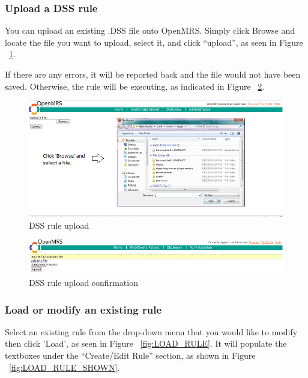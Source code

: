 \documentclass[12pt,letterpaper]{article}
\begin{document}
\newpage
\subsubsection{Upload a DSS rule} \label{sec:UPLOAD_DSS}
	You can upload an existing .DSS file onto OpenMRS. Simply click Browse and locate the file you want to upload, select it, and click “upload”, as seen in Figure ~\ref{fig:UPLOAD_BROWSE}. 
	
	If there are any errors, it will be reported back and the file would not have been saved. Otherwise, the rule will be executing, as indicated in Figure ~\ref{fig:UPLOAD_SUCCESS}.

\begin{figure}[htbp]
\begin{center}
\includegraphics[width=6.5in]{user_guide/upload_browse.png}
\end{center}
\caption{DSS rule upload}
\label{fig:UPLOAD_BROWSE}
\end{figure}

\begin{figure}[htbp]
\begin{center}
\includegraphics[width=6.5in]{user_guide/upload_success.png}
\end{center}
\caption{DSS rule upload confirmation}
\label{fig:UPLOAD_SUCCESS}
\end{figure}


\subsubsection{Load or modify an existing rule} \label{sec:LOAD_RULE}

Select an existing rule from the drop-down menu that you would like to modify then click 'Load', as seen 
in Figure ~\ref{fig:LOAD_RULE}.
It will populate the textboxes under the “Create/Edit Rule” section, as shown in Figure ~\ref{fig:LOAD_RULE_SHOWN}.
\end{document}
